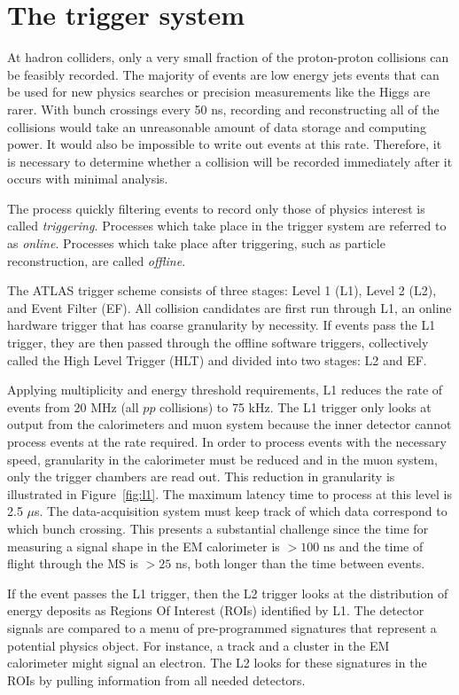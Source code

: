 \section{The trigger system}
At hadron colliders, only a very small fraction of the proton-proton collisions can be feasibly recorded. The majority of events are low energy jets events that can be used for new physics searches or precision measurements like the Higgs are rarer. With bunch crossings every 50 ns, recording and reconstructing all of the collisions would take an unreasonable amount of data storage and computing power. It would also be impossible to write out events at this rate. Therefore, it is necessary to determine whether a collision will be recorded immediately after it occurs with minimal analysis. 

The process quickly filtering events to record only those of physics interest is called \emph{triggering.} Processes which take place in the trigger system are referred to as \emph{online}. Processes which take place after triggering, such as particle reconstruction, are called \emph{offline}.

The ATLAS trigger scheme\cite{TDR-L1} consists of three stages: Level 1 (L1), Level 2 (L2), and Event Filter (EF). All collision candidates are first run through L1, an online hardware trigger that has coarse granularity by necessity. If events pass the L1 trigger, they are then passed through the offline software triggers, collectively called the High Level Trigger (HLT) and divided into two stages: L2 and EF.

Applying multiplicity and energy threshold requirements, L1 reduces the rate of events from 20 MHz (all $pp$ collisions) to 75 kHz. The L1 trigger only looks at output from the calorimeters and muon system because the inner detector cannot process events at the rate required. In order to process events with the necessary speed, granularity in the calorimeter must be reduced and in the muon system, only the trigger chambers are read out. This reduction in granularity is illustrated in Figure~\ref{fig:l1}. The maximum latency time to process at this level is 2.5 $\mu$s. The data-acquisition system must keep track of which data correspond to which bunch crossing. This presents a substantial challenge since the time for measuring a signal shape in the EM calorimeter is $>100$ ns and the time of flight through the MS is $>25$ ns, both longer than the time between events. 

If the event passes the L1 trigger, then the L2 trigger looks at the distribution of energy deposits as Regions Of Interest (ROIs) identified by L1. The detector signals are compared to a menu of pre-programmed signatures that represent a potential physics object. For instance, a track and a cluster in the EM calorimeter might signal an electron. The L2 looks for these signatures in the ROIs by pulling information from all needed detectors. 

